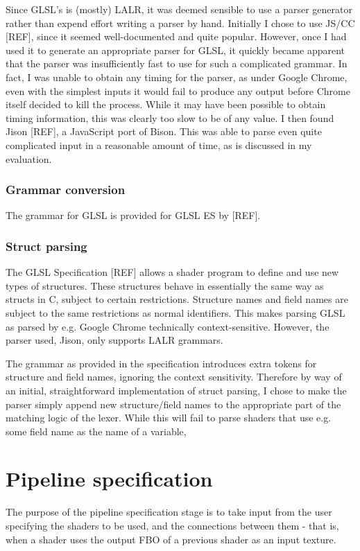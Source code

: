 \documentclass[12pt,twoside,notitlepage]{report}
\begin{document}
Since GLSL's is (mostly) LALR, it was deemed sensible to use a parser generator rather than expend  effort writing a parser by hand. Initially I chose to use JS/CC [REF], since it seemed well-documented and quite popular. However, once I had used it to generate an appropriate parser for GLSL, it quickly became apparent that the parser was insufficiently fast to use for such a complicated grammar. In fact, I was unable to obtain any timing for the parser, as under Google Chrome, even with the simplest inputs it would fail to produce any output before Chrome itself decided to kill the process. While it may have been possible to obtain timing information, this was clearly too slow to be of any value. I then found Jison [REF], a JavaScript port of Bison. This was able to parse even quite complicated input in a reasonable amount of time, as is discussed in my evaluation.

\subsubsection{Grammar conversion}
The grammar for GLSL is provided for GLSL ES by [REF]. 

\subsubsection{Struct parsing}
The GLSL Specification [REF] allows a shader program to define and use new types of structures. These structures behave in essentially the same way as structs in C, subject to certain restrictions. Structure names and field names are subject to the same restrictions as normal identifiers. This makes parsing GLSL as parsed by e.g. Google Chrome technically context-sensitive. However, the parser used, Jison, only supports LALR grammars.

The grammar as provided in the specification introduces extra tokens for structure and field names, ignoring the context sensitivity. Therefore by way of an initial, straightforward implementation of struct parsing, I chose to make the parser simply append new structure/field names to the appropriate part of the matching logic of the lexer. While this will fail to parse shaders that use e.g. some field name as the name of a variable, 

\section{Pipeline specification}
The purpose of the pipeline specification stage is to take input from the user specifying the shaders to be used, and the connections between them - that is, when a shader uses the output FBO of a previous shader as an input texture.
\end{document}
